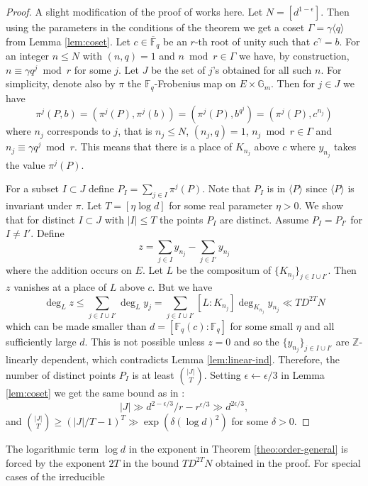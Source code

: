 \documentclass[12pt]{article}
\theoremstyle{plain}
\theoremstyle{definition}
\newcommand{\ang}[1]{\langle#1\rangle}
\newcommand{\abs}[1]{\left\vert#1\right\vert}
\def\Z{\ensuremath{\mathbb{Z}}}
\def\F{\ensuremath{\mathbb{F}}}
\begin{document}
\begin{proof}
	A slight modification of the proof of \cite[Theorem 1.1]{voloch2010} works here. Let $N = [d^{1 
	- \epsilon}]$. Then using the parameters in the conditions of the theorem we get a coset 
	$\Gamma = \gamma \ang{q}$ from Lemma \ref{lem:coset}. Let $c \in \overline{\F}_q$ be an $r$-th 
	root of unity such that $c^\gamma = b$. For an integer $n \le N$ with $(n , q) = 1$ and $n 
	\bmod r \in \Gamma$ we have, by construction, $n \equiv \gamma q^j \bmod r$ for some $j$. Let 
	$J$ be the set of $j$'s obtained for all such $n$. For simplicity, denote also by $\pi$ the 
	$\F_q$-Frobenius map on $E \times \mathbb{G}_m$. Then for $j \in J$ we have
	\[ \pi^j(P, b) = (\pi^j(P), \pi^j(b)) = (\pi^j(P), b^{q^j}) = (\pi^j(P), c^{n_j}) \]
	where $n_j$ corresponds to $j$, that is $n_j \le N$, $(n_j, q) = 1$, $n_j \bmod r \in 
	\Gamma$ and $n_j \equiv \gamma q^j \bmod r$. This means that there is a place of $K_{n_j}$ above 
	$c$ where $y_{n_j}$ takes the value $\pi^j(P)$. 
	
	For a subset $I \subset J$ define $P_I = \sum_{j \in I}\pi^j(P)$. Note that $P_I$ is in 
	$\ang{P}$ since $\ang{P}$ is invariant under $\pi$. Let $T = [\eta \log d]$ for some real 
	parameter $\eta > 0$. We show that for distinct $I \subset J$ with $\abs{I} \le T$ the points 
	$P_I$ are distinct. Assume $P_I = P_{I'}$ for $I \ne I'$. Define  
	\[ z = \sum_{j \in I}y_{n_j} - \sum_{j \in I'}y_{n_j} \]
	where the addition occurs on $E$. Let $L$ be the compositum of $\{ K_{n_j} \}_{j \in I \cup 
	I'}$. Then $z$ vanishes at a place of $L$ above $c$. But we have
	\[ \deg_L z \le \sum_{j \in I \cup I'} \deg_L y_j = \sum_{j \in I \cup I'} [L : K_{n_j}] 
	\deg_{K_{n_j}} y_{n_j} \ll TD^{2T}N \] 
	which can be made smaller than $d = [\F_q(c) : \F_q]$ for some small $\eta$ and all 
	sufficiently large $d$. This is not possible unless $z = 0$ and so the $ \{ y_{n_j} \}_{j \in I 
	\cup I'}$ are $\Z$-linearly dependent, which contradicts Lemma \ref{lem:linear-ind}. Therefore, 
	the number of distinct points $P_I$ is at least $\binom{\abs{J}}{T}$. Setting $\epsilon 
	\leftarrow \epsilon / 3$ in Lemma \ref{lem:coset} we get the same bound as in \cite{voloch2007}:
	\[ \abs{J} \gg d^{2 - \epsilon / 3} / r - r^{\epsilon / 3} \gg d^{2\epsilon / 3}, \]
	and $\binom{\abs{J}}{T} \ge (\abs{J} / T - 1)^T \gg \exp(\delta (\log d)^2)$ for some $\delta > 
	0$.
\end{proof}
The logarithmic term $\log d$ in the exponent in Theorem \ref{theo:order-general} is forced by the 
exponent $2T$ in the bound $TD^{2T}N$ obtained in the proof. For special cases of the irreducible 
\end{document}
